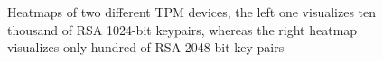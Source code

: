 \begin{figure}[H]
  \centering
  \hfill
  \caption{Heatmaps of two different TPM devices, the left one visualizes ten thousand of RSA 1024-bit keypairs, whereas the right heatmap visualizes only hundred of RSA 2048-bit key pairs}
\end{figure}




